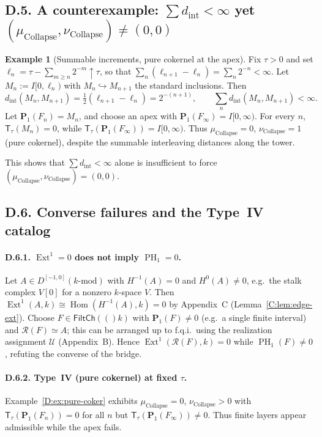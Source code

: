 \documentclass[11pt]{article}
\numberwithin{equation}{section}
\theoremstyle{plain}
\theoremstyle{definition}
\theoremstyle{remark}
\DeclareMathOperator{\Ext}{Ext}
\DeclareMathOperator{\Hom}{Hom}
\DeclareMathOperator{\PH}{PH}
\newcommand{\into}{\hookrightarrow}
\newcommand{\T}{\mathsf{T}}
\newcommand{\Rfun}{\mathcal{R}}
\theoremstyle{plain}
\theoremstyle{definition}
\numberwithin{equation}{section}
\theoremstyle{definition}
\newtheorem{example}[theorem]{Example}
\DeclareRobustCommand{\FiltCh}[1]{\mathsf{FiltCh}(#1)}
\DeclareRobustCommand{\muc}{\mu_{\mathrm{Collapse}}}
\DeclareRobustCommand{\nuc}{\nu_{\mathrm{Collapse}}}
\numberwithin{equation}{section}
\theoremstyle{plain}
\theoremstyle{definition}
\theoremstyle{remark}
\newcommand{\Pfun}{\mathbf{P}}
\newcommand{\Ufun}{\mathcal{U}}
\providecommand{\muc}{\mu_{\mathrm{Collapse}}}
\providecommand{\nuc}{\nu_{\mathrm{Collapse}}}
\begin{document}
\subsection*{D.5. A counterexample: \(\sum d_{\mathrm{int}}<\infty\) yet \((\muc,\nuc)\neq(0,0)\)}\label{subsec:D-counter}

\begin{example}[Summable increments, pure cokernel at the apex]\label{D:ex:summable}
Fix \(\tau>0\) and set \(\ell_n=\tau-\sum_{m\ge n}2^{-m}\uparrow \tau\), so that
\(\sum_{n}(\ell_{n+1}-\ell_{n})=\sum_{n}2^{-n}<\infty\).
Let \(M_n:=I[0,\ell_n)\) with \(M_{n}\into M_{n+1}\) the standard inclusions.
Then
\[
d_{\mathrm{int}}(M_{n},M_{n+1})=\tfrac12(\ell_{n+1}-\ell_{n})=2^{-(n+1)},\qquad \sum_{n} d_{\mathrm{int}}(M_{n},M_{n+1})<\infty.
\]
Let \(\Pfun_1(F_n)=M_n\), and choose an apex with \(\Pfun_1(F_\infty)=I[0,\infty)\).
For every \(n\), \(\T_\tau(M_n)=0\), while \(\T_\tau(\Pfun_1(F_\infty))=I[0,\infty)\).
Thus \(\muc=0\), \(\nuc=1\) (pure cokernel), despite the summable interleaving distances along the tower.
\end{example}

This shows that \(\sum d_{\mathrm{int}}<\infty\) alone is insufficient to force \((\muc,\nuc)=(0,0)\).

\subsection*{D.6. Converse failures and the Type~IV catalog}

\paragraph{D.6.1. \(\Ext^1=0\) does not imply \(\PH_1=0\).}
Let \(A\in D^{[-1,0]}(k\text{-mod})\) with \(H^{-1}(A)=0\) and \(H^0(A)\ne 0\), e.g.\ the stalk complex \(V[0]\) for a nonzero \(k\)-space \(V\).
Then \(\Ext^1(A,k)\cong \Hom(H^{-1}(A),k)=0\) by Appendix~C (Lemma~\ref{C:lem:edge-ext}).
Choose \(F\in\FiltCh(k)\) with \(\Pfun_1(F)\neq 0\) (e.g.\ a single finite interval) and \(\Rfun(F)\simeq A\); this can be arranged up to f.q.i.\ using the realization assignment \(\Ufun\) (Appendix~B).
Hence \(\Ext^1(\Rfun(F),k)=0\) while \(\PH_1(F)\neq 0\), refuting the converse of the bridge.

\paragraph{D.6.2. Type~IV (pure cokernel) at fixed \(\tau\).}
Example~\ref{D:ex:pure-coker} exhibits \(\muc=0\), \(\nuc>0\) with \(\T_\tau(\Pfun_1(F_n))=0\) for all \(n\) but \(\T_\tau(\Pfun_1(F_\infty))\neq 0\).
Thus finite layers appear admissible while the apex fails.
\end{document}
